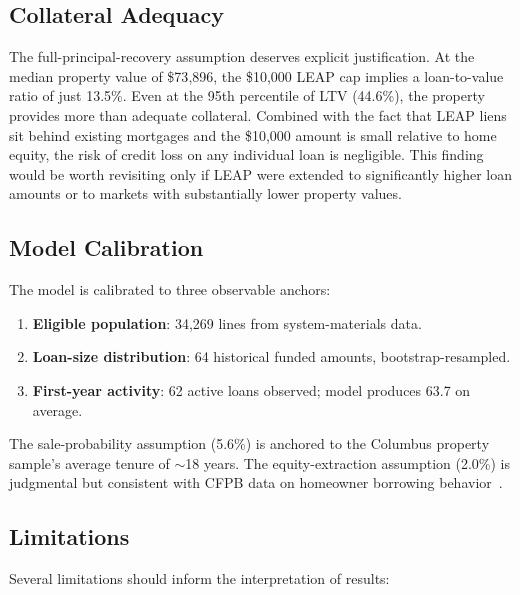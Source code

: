 \documentclass[11pt, letterpaper]{article}
\begin{document}
\subsection{Collateral Adequacy}

The full-principal-recovery assumption deserves explicit justification. At the median property value of \$73{,}896, the \$10{,}000 LEAP cap implies a loan-to-value ratio of just 13.5\%. Even at the 95th percentile of LTV (44.6\%), the property provides more than adequate collateral. Combined with the fact that LEAP liens sit behind existing mortgages and the \$10{,}000 amount is small relative to home equity, the risk of credit loss on any individual loan is negligible. This finding would be worth revisiting only if LEAP were extended to significantly higher loan amounts or to markets with substantially lower property values.

\subsection{Model Calibration}

The model is calibrated to three observable anchors:

\begin{enumerate}[nosep]
  \item \textbf{Eligible population}: 34{,}269 lines from system-materials data.
  \item \textbf{Loan-size distribution}: 64 historical funded amounts, bootstrap-resampled.
  \item \textbf{First-year activity}: 62 active loans observed; model produces 63.7 on average.
\end{enumerate}

The sale-probability assumption (5.6\%) is anchored to the Columbus property sample's average tenure of ${\sim}$18 years. The equity-extraction assumption (2.0\%) is judgmental but consistent with CFPB data on homeowner borrowing behavior~\cite{cfpb2023}.

\subsection{Limitations}

Several limitations should inform the interpretation of results:
\end{document}
